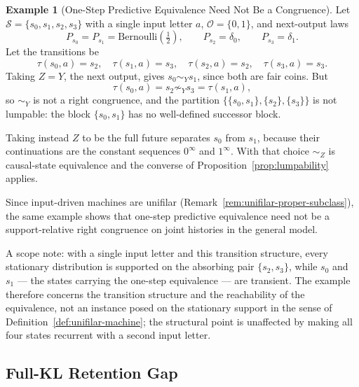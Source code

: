 \documentclass[12pt]{article}
\theoremstyle{definition}
\newtheorem{example}[theorem]{Example}
\begin{document}
\begin{example}[One-Step Predictive Equivalence Need Not Be a Congruence]
\label{ex:onestep-not-congruence}
Let $\mathcal S=\{s_0,s_1,s_2,s_3\}$ with a single input letter $a$,
$\mathcal O=\{0,1\}$, and next-output laws
\[
P_{s_0}=P_{s_1}=\mathrm{Bernoulli}(\tfrac12),
\qquad
P_{s_2}=\delta_0,
\qquad
P_{s_3}=\delta_1 .
\]
Let the transitions be
\[
\tau(s_0,a)=s_2,\quad
\tau(s_1,a)=s_3,\quad
\tau(s_2,a)=s_2,\quad
\tau(s_3,a)=s_3 .
\]
Taking $Z=Y$, the next output, gives $s_0\sim_Ys_1$, since both are fair
coins.  But
\[
\tau(s_0,a)=s_2\not\sim_Y s_3=\tau(s_1,a),
\]
so $\sim_Y$ is not a right congruence, and the partition
$\{\{s_0,s_1\},\{s_2\},\{s_3\}\}$ is not lumpable: the block
$\{s_0,s_1\}$ has no well-defined successor block.

Taking instead $Z$ to be the full future separates $s_0$ from $s_1$, because
their continuations are the constant sequences $0^\infty$ and $1^\infty$.  With
that choice $\sim_Z$ is causal-state equivalence and the converse of
Proposition~\ref{prop:lumpability} applies.

Since input-driven machines are unifilar
(Remark~\ref{rem:unifilar-proper-subclass}), the same example shows that
one-step predictive equivalence need not be a support-relative right
congruence on joint histories in the general model.

A scope note: with a single input letter and this transition structure, every
stationary distribution is supported on the absorbing pair $\{s_2,s_3\}$,
while $s_0$ and $s_1$ --- the states carrying the one-step equivalence --- are
transient.  The example therefore concerns the transition structure and the
reachability of the equivalence, not an instance posed on the stationary
support in the sense of Definition~\ref{def:unifilar-machine}; the structural
point is unaffected by making all four states recurrent with a second input
letter.
\end{example}

\subsection{Full-KL Retention Gap}
\label{subsec:full-kl-gap}
\end{document}
